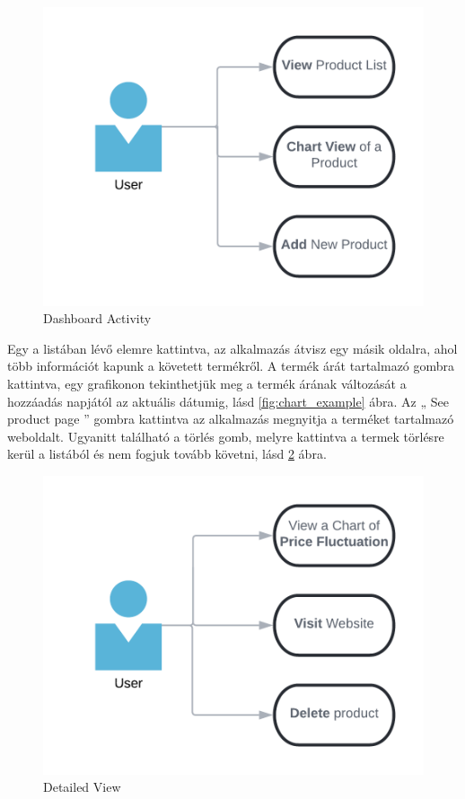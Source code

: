 \begin{figure}[H]
    \centering
    \includegraphics[scale=0.3]{figures/images/dashboard_activity.png}
    \caption{Dashboard Activity}
    \label{fig:dashboard_activity_diag}
\end{figure}

Egy a listában lévő elemre kattintva, az alkalmazás átvisz egy másik oldalra, ahol több információt kapunk a követett termékről. A termék árát tartalmazó gombra kattintva, egy grafikonon tekinthetjük meg a termék árának változását a hozzáadás napjától az aktuális dátumig, lásd \ref{fig:chart_example} ábra. Az „ See product page ” gombra kattintva az alkalmazás megnyitja a terméket tartalmazó weboldalt. Ugyanitt található a törlés gomb, melyre kattintva a termek törlésre kerül a listából és nem fogjuk tovább követni, lásd \ref{fig:detailed_view_diag} ábra.

\begin{figure}[H]
    \centering
    \includegraphics[scale=0.3]{figures/images/chart_view_activity.png}
    \caption{Detailed View}
    \label{fig:detailed_view_diag}
\end{figure}

